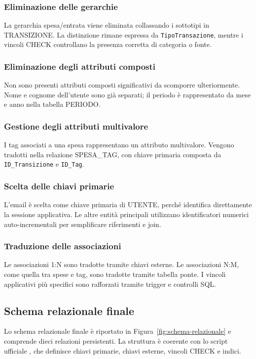 \documentclass[11pt,a4paper]{article}
\begin{document}
\subsubsection{Eliminazione delle gerarchie}
La gerarchia spesa/entrata viene eliminata collassando i sottotipi in \textsc{TRANSIZIONE}. La distinzione rimane espressa da \texttt{TipoTransazione}, mentre i vincoli CHECK controllano la presenza corretta di categoria o fonte.

\subsubsection{Eliminazione degli attributi composti}
Non sono presenti attributi composti significativi da scomporre ulteriormente. Nome e cognome dell'utente sono già separati; il periodo è rappresentato da mese e anno nella tabella \textsc{PERIODO}.

\subsubsection{Gestione degli attributi multivalore}
I tag associati a una spesa rappresentano un attributo multivalore. Vengono tradotti nella relazione \textsc{SPESA\_TAG}, con chiave primaria composta da \texttt{ID\_Transizione} e \texttt{ID\_Tag}.

\subsubsection{Scelta delle chiavi primarie}
L'email è scelta come chiave primaria di \textsc{UTENTE}, perché identifica direttamente la sessione applicativa. Le altre entità principali utilizzano identificatori numerici auto-incrementali per semplificare riferimenti e join.

\subsubsection{Traduzione delle associazioni}
Le associazioni 1:N sono tradotte tramite chiavi esterne. Le associazioni N:M, come quella tra spese e tag, sono tradotte tramite tabella ponte. I vincoli applicativi più specifici sono rafforzati tramite trigger e controlli SQL.

\subsection{Schema relazionale finale}
Lo schema relazionale finale è riportato in Figura~\ref{fig:schema-relazionale} e comprende dieci relazioni persistenti. La struttura è coerente con lo script ufficiale , che definisce chiavi primarie, chiavi esterne, vincoli CHECK e indici.
\end{document}
